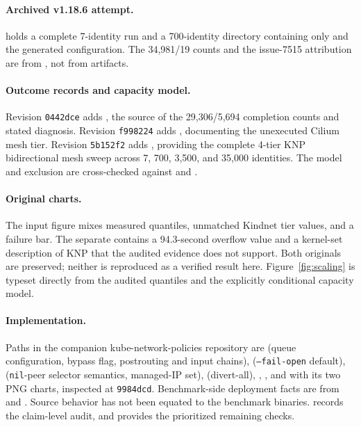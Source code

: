 \documentclass[letterpaper,twocolumn,10pt]{article}
\newcommand{\sys}{\textsc{KNP}}
\begin{document}
\paragraph{Archived v1.18.6 attempt.}
 holds a complete
7-identity run and a 700-identity directory containing only
 and the generated configuration. The
34,981/19 counts and the issue-7515 attribution are from
, not from artifacts.

\paragraph{Outcome records and capacity model.}
Revision \texttt{0442dce} adds
,
the source of the 29,306/5,694 completion counts and stated diagnosis.
Revision \texttt{f998224} adds
, documenting the
unexecuted Cilium mesh tier. Revision \texttt{5b152f2} adds
, providing the complete 4-tier
\sys{} bidirectional mesh sweep across 7, 700, 3,500, and 35,000 identities.
The model and exclusion are cross-checked against
 and
.

\paragraph{Original charts.}
The input figure 
mixes measured quantiles, unmatched Kindnet tier values, and a failure
bar. The separate 
contains a 94.3-second overflow value and a kernel-set description of
\sys{} that the audited evidence does not support. Both originals
are preserved; neither is reproduced as a verified result here.
Figure~\ref{fig:scaling} is typeset directly from the audited quantiles
and the explicitly conditional capacity model.

\paragraph{Implementation.}
Paths in the companion kube-network-policies repository are
 (queue configuration, bypass flag,
postrouting and input chains), 
(\texttt{--fail-open} default), 
(\texttt{nil}-peer selector semantics, managed-IP set),
 (divert-all),
, ,
and  with its two PNG charts, inspected at
\texttt{9984dcd}. Benchmark-side deployment facts are from
 and
. Source behavior has not been equated
to the benchmark binaries.  records
the claim-level audit, and 
provides the prioritized remaining checks.
\end{document}
